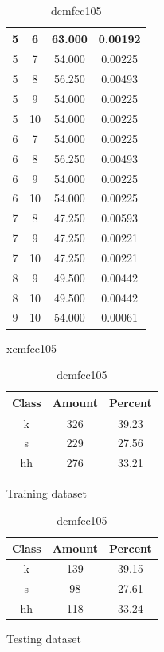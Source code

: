 \begin{table}
\begin{subtable}[tbp]{0.45\textwidth}
{\begin{tabular}{|c|c|c|c|}
 5 & 6 & 63.000 & 0.00192\\ \hline 
 5 & 7 & 54.000 & 0.00225\\ \hline 
 5 & 8 & 56.250 & 0.00493\\ \hline 
 5 & 9 & 54.000 & 0.00225\\ \hline 
 5 & 10 & 54.000 & 0.00225\\ \hline 
 6 & 7 & 54.000 & 0.00225\\ \hline 
 6 & 8 & 56.250 & 0.00493\\ \hline 
 6 & 9 & 54.000 & 0.00225\\ \hline 
 6 & 10 & 54.000 & 0.00225\\ \hline 
 7 & 8 & 47.250 & 0.00593\\ \hline 
 7 & 9 & 47.250 & 0.00221\\ \hline 
 7 & 10 & 47.250 & 0.00221\\ \hline 
 8 & 9 & 49.500 & 0.00442\\ \hline 
 8 & 10 & 49.500 & 0.00442\\ \hline 
 9 & 10 & 54.000 & 0.00061\\ \hline 

\end{tabular}
} \label{xlmfcc105}
\caption{xcmfcc105}
\end{subtable}

\begin{subtable}[tbp]{0.45\textwidth}
\centering
\begin{tabular}{|c|c|c|}
\hline
Class & Amount & Percent\\ \hline
k & 326 & 39.23\\ \hline
s & 229 & 27.56\\ \hline
hh & 276 & 33.21\\ \hline
\end{tabular}
\caption{Training dataset}
\end{subtable}
\hfill
\begin{subtable}[tbp]{0.45\textwidth}
\centering
\begin{tabular}{|c|c|c|}
\hline
Class & Amount & Percent\\ \hline
k & 139 & 39.15\\ \hline
s & 98 & 27.61\\ \hline
hh & 118 & 33.24\\ \hline
\end{tabular}
\caption{Testing dataset}
\end{subtable}
\hfill

\label{dlmfcc105}

\caption{dcmfcc105}

\end{table}\clearpage


